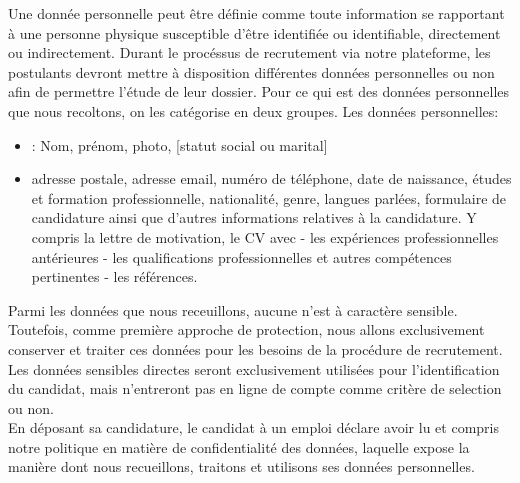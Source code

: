 Une donnée personnelle peut être définie comme toute information se rapportant à une personne physique susceptible d'être identifiée ou identifiable, directement ou indirectement.  Durant le procéssus de recrutement via notre plateforme, les postulants devront mettre à disposition différentes données personnelles ou non afin de permettre l'étude de leur dossier. Pour ce qui est des données personnelles que nous recoltons, on les catégorise en deux groupes. Les données personnelles:
\begin{itemize}
\item {} : Nom, prénom, photo, [statut social ou marital]
\item {} adresse postale, adresse email, numéro de téléphone, date de naissance, études et formation professionnelle, nationalité, genre, langues parlées, formulaire de candidature ainsi que d'autres informations relatives à la candidature. Y compris la lettre de motivation, le CV avec - les expériences professionnelles antérieures - les qualifications professionnelles et autres compétences pertinentes - les références.
\end{itemize}
Parmi les données que nous receuillons, aucune n'est à caractère sensible. Toutefois, comme première approche de protection, nous allons exclusivement conserver et traiter ces données  pour les besoins de la procédure de recrutement. Les données sensibles directes seront exclusivement utilisées pour l'identification du candidat, mais n'entreront pas en ligne de compte comme critère de selection ou non. \\ 
En déposant sa candidature, le candidat à un emploi déclare avoir lu et compris notre politique en matière de confidentialité des données, laquelle expose la manière dont nous recueillons, traitons et utilisons ses données personnelles.
 

